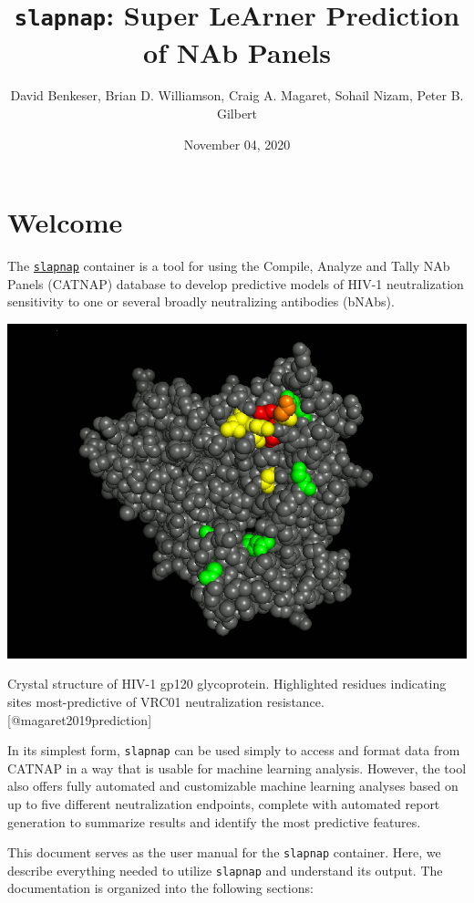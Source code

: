 \documentclass[]{article}
\title{\texttt{slapnap}: Super LeArner Prediction of NAb Panels}
\author{David Benkeser, Brian D. Williamson, Craig A. Magaret, Sohail Nizam,
Peter B. Gilbert}
\date{November 04, 2020}
\begin{document}
\maketitle

{
\setcounter{tocdepth}{2}
\tableofcontents
}
\section*{Welcome}\label{welcome}

The \href{https://hub.docker.com/r/slapnap/slapnap}{\texttt{slapnap}}
container is a tool for using the Compile, Analyze and Tally NAb Panels
(CATNAP) database to develop predictive models of HIV-1 neutralization
sensitivity to one or several broadly neutralizing antibodies (bNAbs).

\begin{center}\includegraphics[width=0.7\linewidth]{gp120} \end{center}\begin{center}
Crystal structure of HIV-1 gp120 glycoprotein. Highlighted residues
indicating sites most-predictive of VRC01 neutralization resistance.
{[}@magaret2019prediction{]}
\end{center}

In its simplest form, \texttt{slapnap} can be used simply to access and
format data from CATNAP in a way that is usable for machine learning
analysis. However, the tool also offers fully automated and customizable
machine learning analyses based on up to five different neutralization
endpoints, complete with automated report generation to summarize
results and identify the most predictive features.

This document serves as the user manual for the \texttt{slapnap}
container. Here, we describe everything needed to utilize
\texttt{slapnap} and understand its output. The documentation is
organized into the following sections:
\end{document}
